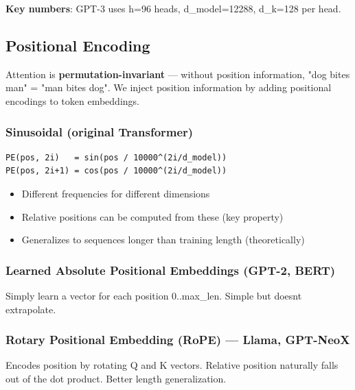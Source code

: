 \documentclass[11pt]{article}
\providecommand{\tightlist}{\setlength{\itemsep}{1pt}\setlength{\parskip}{0pt}}
\begin{document}
\textbf{Key numbers}: GPT-3 uses h=96 heads, d\_model=12288, d\_k=128 per head.

\subsection{Positional Encoding}\label{positional-encoding}

Attention is \textbf{permutation-invariant} --- without position information, "dog bites man" = "man bites dog". We inject position information by adding positional encodings to token embeddings.

\subsubsection{Sinusoidal (original Transformer)}\label{sinusoidal-original-transformer}

\setcodelang{}

\begin{verbatim}
PE(pos, 2i)   = sin(pos / 10000^(2i/d_model))
PE(pos, 2i+1) = cos(pos / 10000^(2i/d_model))
\end{verbatim}

\begin{itemize}
\tightlist
\item
  Different frequencies for different dimensions
\item
  Relative positions can be computed from these (key property)
\item
  Generalizes to sequences longer than training length (theoretically)
\end{itemize}

\subsubsection{Learned Absolute Positional Embeddings (GPT-2, BERT)}\label{learned-absolute-positional-embeddings-gpt-2-bert}

Simply learn a vector for each position 0..max\_len. Simple but doesn\textquotesingle t extrapolate.

\subsubsection{Rotary Positional Embedding (RoPE) --- Llama, GPT-NeoX}\label{rotary-positional-embedding-rope--llama-gpt-neox}

Encodes position by rotating Q and K vectors. Relative position naturally falls out of the dot product. Better length generalization.
\end{document}
